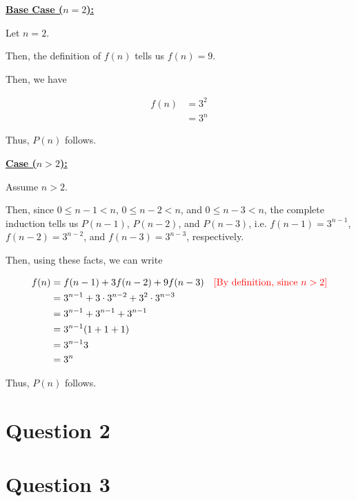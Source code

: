 \documentclass[12pt]{article}
\begin{document}
\begin{mdframed}
    \bigskip

    \underline{\textbf{Base Case ($n = 2$):}}

    \bigskip

    Let $n = 2$.

    \bigskip

    Then, the definition of $f(n)$ tells us $f(n) = 9$.

    \bigskip

    Then, we have

    \begin{align}
        f(n) &= 3^2\\
        &= 3^n
    \end{align}

    \bigskip

    Thus, $P(n)$ follows.

    \bigskip

    \underline{\textbf{Case ($n > 2$):}}

    \bigskip

    Assume $n > 2$.

    \bigskip

    Then, since $0 \leq n - 1 < n$, $0 \leq n -2 < n$, and $0 \leq n - 3 < n$,
    the complete induction tells us $P(n-1)$, $P(n-2)$, and $P(n-3)$, i.e.
    $f(n-1) = 3^{n-1}$, $f(n-2) = 3^{n-2}$, and $f(n-3) = 3^{n-3}$, respectively.

    \bigskip

    Then, using these facts, we can write

    \begin{align}
        f(n) &= f(n-1) + 3f(n-2) + 9f(n-3) & \color{red}[\text{By definition, since $n > 2$}]\color{black}\\
        &= 3^{n-1} + 3 \cdot 3^{n-2} + 3^2 \cdot 3^{n-3}\\
        &= 3^{n-1} + 3^{n-1} + 3^{n-1}\\
        &= 3^{n-1}(1 + 1 + 1)\\
        &= 3^{n-1}3\\
        &= 3^n
    \end{align}

    \bigskip

    Thus, $P(n)$ follows.
    \bigskip
\end{mdframed}

\section*{Question 2}

\section*{Question 3}
\end{document}
